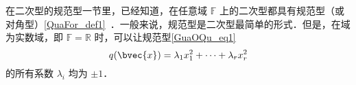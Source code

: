 
\begin{issues}
\issueDraft
\end{issues}

在二次型的规范型一节里，已经知道，在任意域 $\mathbb F$ 上的二次型都具有规范型（或对角型）\autoref{QuaFor_def1}~．一般来说，规范型是二次型最简单的形式．但是，在域为实数域，即 $\mathbb F=\mathbb R$ 时，可以让规范型\autoref{GuaOQu_eq1}~
\begin{equation}
q(\bvec{x})=\lambda_1 x_1^2+\cdots+\lambda_r x_r^2
\end{equation}
的所有系数 $\lambda_i$ 均为 $\pm 1$．

